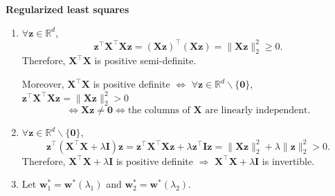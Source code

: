 \documentclass[11pt,letter,notitlepage]{article}
\begin{document}
\begin{solution} \textbf{Regularized least squares}
\begin{enumerate}
	\item
	$\forall \mathbf{z} \in \mathbb{R}^d$,
	\[
	\mathbf{z}^\top \mathbf{X}^\top \mathbf{X} \mathbf{z}
	=
	(\mathbf{X} \mathbf{z})^\top (\mathbf{X} \mathbf{z})
	=
	\|\mathbf{X} \mathbf{z}\|_2^2
	\geq
	0.
	\]
	Therefore, $\mathbf{X}^\top \mathbf{X}$ is positive semi-definite.

	Moreover, $\mathbf{X}^\top \mathbf{X}$ is positive definite $\Longleftrightarrow$ $\forall \mathbf{z} \in \mathbb{R}^d \backslash \{\mathbf{0}\}$, $\mathbf{z}^\top \mathbf{X}^\top \mathbf{X} \mathbf{z}
	=
	\|\mathbf{X} \mathbf{z}\|_2^2
	>
	0$
	\[
	\Longleftrightarrow
	\mathbf{X} \mathbf{z} \neq \mathbf{0}
	\Longleftrightarrow
	\text{the columns of } \mathbf{X} \text{ are linearly independent.}
	\]
	\item 
	$\forall \mathbf{z} \in \mathbb{R}^d \backslash \{\mathbf{0}\}$,
	\[
	\mathbf{z}^\top (\mathbf{X}^\top \mathbf{X} + \lambda \mathbf{I}) \mathbf{z}
	=
	\mathbf{z}^\top \mathbf{X}^\top \mathbf{X} \mathbf{z}
	+
	\lambda \mathbf{z}^\top \mathbf{I} \mathbf{z}
	=
	\|\mathbf{X} \mathbf{z}\|_2^2
	+
	\lambda \|\mathbf{z}\|_2^2
	>
	0.
	\]
	Therefore, $\mathbf{X}^\top \mathbf{X} + \lambda \mathbf{I}$ is positive definite $\Longrightarrow$ $\mathbf{X}^\top \mathbf{X} + \lambda \mathbf{I}$ is invertible.
	\item 
	Let $\mathbf{w}_1^* = \mathbf{w}^*(\lambda_1)$ and $\mathbf{w}_2^* = \mathbf{w}^*(\lambda_2)$.


\end{enumerate}
\end{solution}
\end{document}

